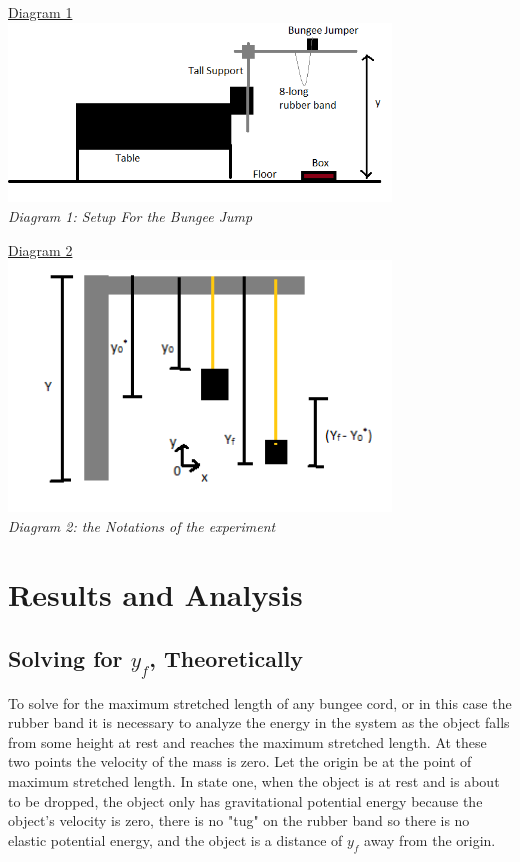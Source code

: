\documentclass[aps,letterpaper,11pt]{revtex4}
\begin{document}
\begin{center}
\underline{Diagram 1}\\
\includegraphics[width = 4in]{Setup.png}\\
\textit{Diagram 1: Setup For the Bungee Jump}\\
\end{center}

\newpage

\begin{center}
\underline{Diagram 2}\\
\includegraphics[width=4in]{Notations.png}\\
\textit{Diagram 2: the Notations of the experiment}
\end{center}

\section{Results and Analysis}

\subsection{Solving for $y_f$, Theoretically}

To solve for the maximum stretched length of any bungee cord, or in this case the rubber band it is necessary to analyze the energy in the system as the object falls from some height at rest and reaches the maximum stretched length. At these two points the velocity of the mass is zero. Let the origin be at the point of maximum stretched length. In state one, when the object is at rest and is about to be dropped, the object only has gravitational potential energy because the object's velocity is zero, there is no "tug" on the rubber band so there is no elastic potential energy, and the object is a distance of $y_f$ away from the origin. 
\end{document}
